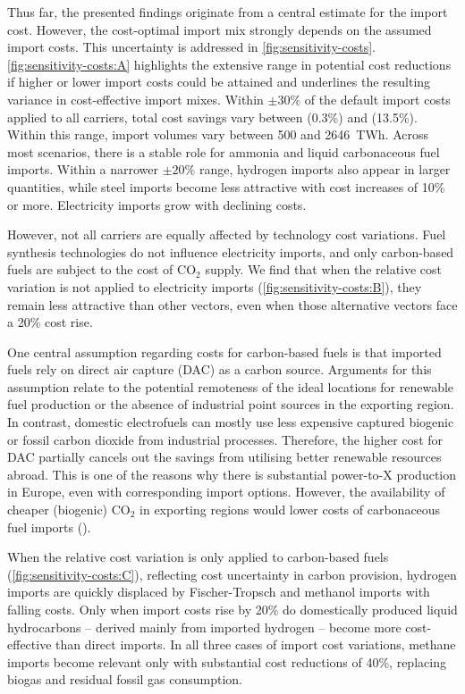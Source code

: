 Thus far, the presented findings originate from a central estimate for the
import cost. However, the cost-optimal import mix strongly depends on the
assumed import costs. This uncertainty is addressed in
\cref{fig:sensitivity-costs}. \cref{fig:sensitivity-costs:A} highlights the
extensive range in potential cost reductions if higher or lower import costs
could be attained and underlines the resulting variance in cost-effective import
mixes. Within $\pm 30\%$ of the default import costs applied to all carriers,
total cost savings vary between  (0.3\%) and  (13.5\%).
Within this range, import volumes vary between 500 and 2646~TWh. Across most
scenarios, there is a stable role for ammonia and liquid carbonaceous fuel
imports. Within a narrower $\pm 20\%$ range, hydrogen imports also appear in
larger quantities, while steel imports become less attractive with cost
increases of 10\% or more. Electricity imports grow with declining costs.

However, not all carriers are equally affected by technology cost variations.
Fuel synthesis technologies do not influence electricity imports, and only
carbon-based fuels are subject to the cost of CO$_2$ supply. We find that when
the relative cost variation is not applied to electricity imports
(\cref{fig:sensitivity-costs:B}), they remain less attractive than other
vectors, even when those alternative vectors face a 20\% cost rise.

One central assumption regarding costs for carbon-based fuels is that imported
fuels rely on direct air capture (DAC) as a carbon source. Arguments for this
assumption relate to the potential remoteness of the ideal locations for
renewable fuel production or the absence of industrial point sources in the
exporting region. In contrast, domestic electrofuels can mostly use less
expensive captured biogenic or fossil carbon dioxide from industrial processes.
Therefore, the higher cost for DAC partially cancels out the savings from
utilising better renewable resources abroad. This is one of the reasons why
there is substantial power-to-X production in Europe, even with corresponding
import options. However, the availability of cheaper (biogenic) CO$_2$ in
exporting regions would lower costs of carbonaceous fuel imports
().

When the relative cost variation is only applied to carbon-based fuels
(\cref{fig:sensitivity-costs:C}), reflecting cost uncertainty in carbon
provision, hydrogen imports are quickly displaced by Fischer-Tropsch and
methanol imports with falling costs. Only when import costs rise by 20\% do
domestically produced liquid hydrocarbons -- derived mainly from imported
hydrogen -- become more cost-effective than direct imports. In all three cases
of import cost variations, methane imports become relevant only with substantial
cost reductions of 40\%, replacing biogas and residual fossil gas consumption.


